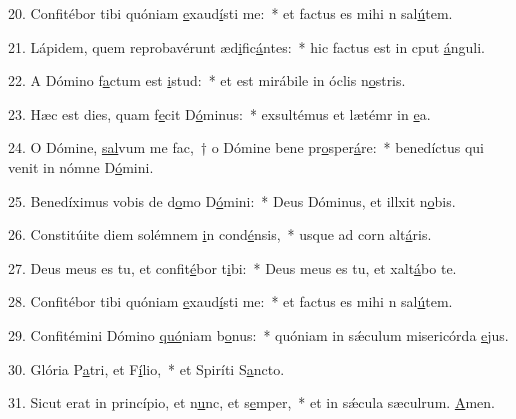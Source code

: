 20. Confitébor tibi quóniam \uline{e}xaud\uline{í}sti me:~* et factus es mihi n sal\uline{ú}tem.\par 
21. Lápidem, quem reprobavérunt æd\uline{i}fic\uline{á}ntes:~* hic factus est in cput \uline{á}nguli.\par 
22. A Dómino f\uline{a}ctum est \uline{i}stud:~* et est mirábile in óclis n\uline{o}stris.\par 
23. Hæc est dies, quam f\uline{e}cit D\uline{ó}minus:~* exsultémus et lætémr in \uline{e}a.\par 
24. O Dómine, \uline{sal}vum me fac,~† o Dómine bene pr\uline{o}sper\uline{á}re:~* benedíctus qui venit in nómne D\uline{ó}mini.\par 
25. Benedíximus vobis de d\uline{o}mo D\uline{ó}mini:~* Deus Dóminus, et illxit n\uline{o}bis.\par 
26. Constitúite diem solémnem \uline{i}n cond\uline{é}nsis,~* usque ad corn alt\uline{á}ris.\par 
27. Deus meus es tu, et confit\uline{é}bor t\uline{i}bi:~* Deus meus es tu, et xalt\uline{á}bo te.\par 
28. Confitébor tibi quóniam \uline{e}xaud\uline{í}sti me:~* et factus es mihi n sal\uline{ú}tem.\par 
29. Confitémini Dómino \uline{quó}niam b\uline{o}nus:~* quóniam in sǽculum misericórda \uline{e}jus.\par 
30. Glória P\uline{a}tri, et F\uline{í}lio,~* et Spiríti S\uline{a}ncto.\par 
31. Sicut erat in princípio, et n\uline{u}nc, et s\uline{e}mper,~* et in sǽcula sæculrum. \uline{A}men.\par 
